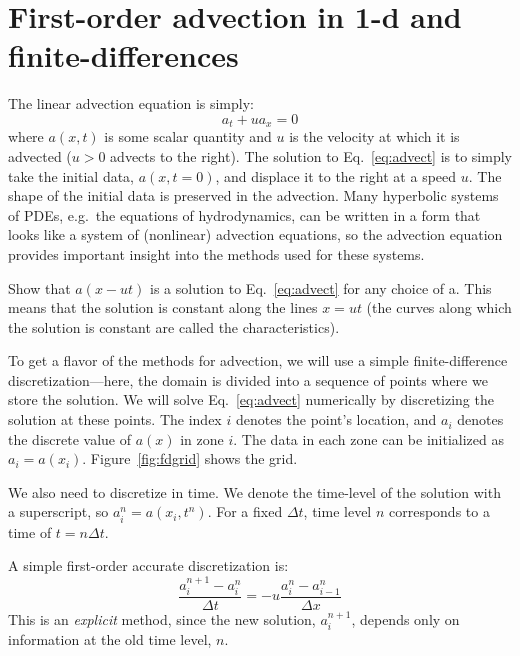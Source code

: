 
\begin{quote}
\end{quote}


\section{First-order advection in 1-d and finite-differences}

The linear advection equation is simply:
\begin{equation}
\label{eq:advect}
a_t + u a_x = 0
\end{equation}
where $a(x,t)$ is some scalar quantity and $u$ is the velocity at
which it is advected ($u > 0$ advects to the right).  The solution to
Eq.~\ref{eq:advect} is to simply take the initial data, $a(x,t=0)$,
and displace it to the right at a speed $u$.  The shape of the initial
data is preserved in the advection.  Many hyperbolic systems of PDEs,
e.g.\ the equations of hydrodynamics, can be written in a form that
looks like a system of (nonlinear) advection equations, so the
advection equation provides important insight into the methods used
for these systems.
%
\begin{exercise}
{Show that $a(x - ut)$ is a solution to
  Eq.~\ref{eq:advect} for any choice of a.  This means that
the solution is constant along the lines $x = u t$
(the curves along which the solution is constant are called the
characteristics).}
\end{exercise}

To get a flavor of the methods for advection, we will use a simple
finite-difference discretization---here, the domain is divided into
a sequence of points where we store the solution.
We will solve
Eq.~\ref{eq:advect} numerically by discretizing the solution at
these points.  The index $i$ denotes the point's location, and $a_i$
denotes the discrete value of $a(x)$ in zone $i$.  The data in each
zone can be initialized as $a_i = a(x_i)$.  Figure~\ref{fig:fdgrid}
shows the grid.

We also need to discretize in time.  We denote the time-level of the
solution with a superscript, so $a_i^n = a(x_i,t^n)$.  For a fixed
$\Delta t$, time level $n$ corresponds to a time of $t = n\Delta t$.


A simple first-order accurate discretization is:
\begin{equation}
\frac{a_i^{n+1} - a_i^n}{\Delta t} = - u \frac{a_i^n - a_{i-1}^n}{\Delta x}
\label{eq:fo}
\end{equation}
This is an {\em explicit} method, since the new solution, $a_i^{n+1}$,
depends only on information at the old time level, $n$.  

